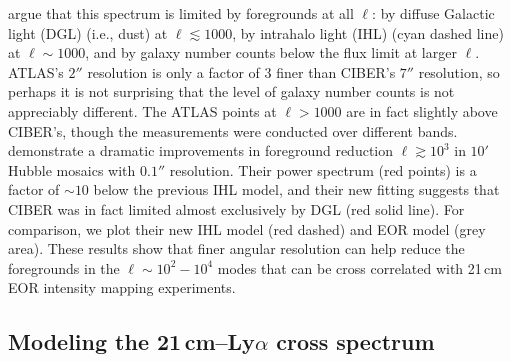 \documentclass[numberedappendix]{emulateapj}
\begin{document}
\citet{zemcov14} argue that this spectrum is limited by foregrounds at all $\ell$: by diffuse Galactic light (DGL) (i.e., dust) at $\ell\lesssim1000$, by intrahalo light (IHL) (cyan dashed line) at $\ell\sim1000$, and by galaxy number counts below the flux limit at larger $\ell$. ATLAS's $2''$ resolution is only a factor of 3 finer than CIBER's $7''$ resolution, so perhaps it is not surprising that the level of galaxy number counts is not appreciably different. The ATLAS points at $\ell>1000$ are in fact slightly above CIBER's, though the measurements were conducted over different bands. \citet{mw15} demonstrate a dramatic improvements in foreground reduction $\ell\gtrsim10^3$ in $10'$ Hubble mosaics with $0.1''$ resolution. Their power spectrum (red points) is a factor of $\sim10$ below the previous IHL model, and their new fitting suggests that CIBER was in fact limited almost exclusively by DGL (red solid line). For comparison, we plot their new IHL model (red dashed) and EOR model (grey area). These results show that finer angular resolution can help reduce the foregrounds in the $\ell\sim10^2-10^4$ modes that can be cross correlated with 21\,cm EOR intensity mapping experiments. 

\subsection{Modeling the 21\,cm--Ly$\alpha$ cross spectrum}
\label{sec:modelingthecrossspectrum}
\end{document}
